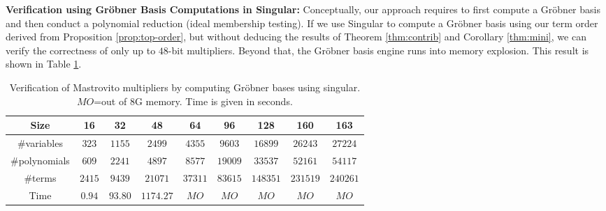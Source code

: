{\bf Verification using Gr\"obner Basis Computations in {\sc Singular}: }
Conceptually, our approach requires to first compute a Gr\"obner basis
and then conduct a polynomial reduction (ideal membership testing).  
If we use {\sc Singular} to compute a Gr\"obner basis
using our term order derived from Proposition \ref{prop:top-order},
but without deducing the results of Theorem \ref{thm:contrib} and
Corollary \ref{thm:mini}, we can verify the correctness of only up to
$48$-bit multipliers.   Beyond that, the Gr\"obner basis engine runs
into memory explosion. This result is shown in Table
\ref{tab:wastetime}.  


\begin{table}[b]
\begin{center}
\caption{Verification of Mastrovito multipliers by computing
  Gr\"obner bases using {\sc singular}. $MO$=out of $8$G memory. Time
  is given in seconds.}  
\label{tab:wastetime}
\begin{tabular}{|c||c|c|c|c|c|c|c|c|} \hline 
Size & 16 & 32 &48  &64 & 96 & 128 &160 &163\\
\hline 
\#variables &$323$ &$1155$ &$2499$ &$4355$ &$9603$ &$16899$ &$26243$ &$27224$ \\
\hline
\#polynomials &$609$ &$2241$ &$4897$ &$8577$ &$19009$ &$33537$ &$52161$ &$54117$ \\
\hline
\#terms &$2415$ &$9439$ &$21071$ &$37311$  &$83615$ &$148351$ &$231519$ &$240261$ \\
\hline
Time& $0.94$ &$93.80$ & $1174.27$ & $MO$ &$MO$ &$MO$ &$MO$ &$MO$\\
\hline
\end{tabular}
\end{center}
\end{table}


